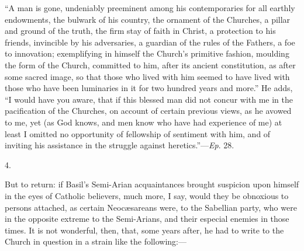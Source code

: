 ``A man is gone, undeniably preeminent among his contemporaries
for all earthly endowments, the bulwark of his country, the ornament
of the Churches, a pillar and ground of the truth, the firm stay of
faith in Christ, a protection to his friends, invincible by his
adversaries, a guardian of the rules of the Fathers, a foe to
innovation; exemplifying in himself the Church's primitive fashion,
moulding the form of the Church, committed to him, after its ancient
constitution, as after some sacred image, so that those who lived with
him seemed to have lived with those who have been luminaries in it for
two hundred years and more.'' He adds, ``I would have you
aware, that if this blessed man did not concur with me in the
pacification of the Churches, on account of certain previous views, as
he avowed to me, yet (as God knows, and men know who have had
experience of me) at least I omitted no opportunity of fellowship of
sentiment with him, and of inviting his assistance in the struggle
against heretics.''—\emph{Ep}. 28.

4.

But to return: if Basil's Semi-Arian acquaintances brought
suspicion upon himself in the eyes of Catholic believers, much
more, I say, would they be obnoxious to persons attached, as certain
Neocæsareans were, to the Sabellian party, who were in the opposite
extreme to the Semi-Arians, and their especial enemies in those times.
It is not wonderful, then, that, some years after, he had to write to
the Church in question in a strain like the following:—


